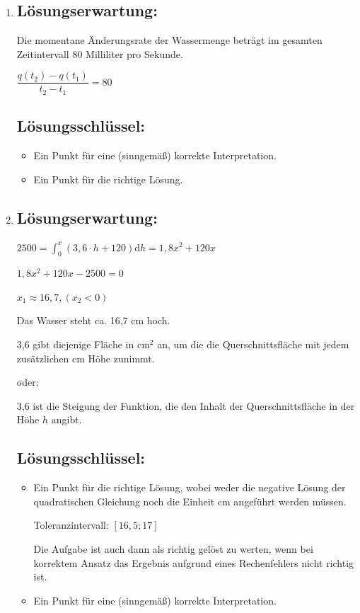 \begin{langesbeispiel}
{\begin{enumerate}
	\item \subsection{Lösungserwartung:}
			
		Die momentane Änderungsrate der Wassermenge beträgt im gesamten Zeitintervall 80 Milliliter pro Sekunde.
		
		$\dfrac{q(t_2)-q(t_1)}{t_2-t_1}=80$

	\subsection{Lösungsschlüssel:}
	
\begin{itemize}
	\item Ein Punkt für eine (sinngemäß) korrekte Interpretation.
	\item Ein Punkt für die richtige Lösung.
\end{itemize}

\item \subsection{Lösungserwartung:}
	$2500=\int^x_0{(3,6\cdot h+120)}$d$h=1,8x^2+120x$
	
	$1,8x^2+120x-2500=0$
	
	$x_1\approx 16,7, (x_2<0)$
	
	Das Wasser steht ca. 16,7 cm hoch.
	
	3,6 gibt diejenige Fläche in cm$^2$ an, um die die Querschnittsfläche mit jedem zusätzlichen cm Höhe zunimmt. 
	
	oder: 
	
	3,6 ist die Steigung der Funktion, die den Inhalt der Querschnittsfläche in der Höhe $h$ angibt.

	\subsection{Lösungsschlüssel:}
	
\begin{itemize}
	\item Ein Punkt für die richtige Lösung, wobei weder die negative Lösung der quadratischen Gleichung noch die Einheit cm angeführt werden müssen.
		
		Toleranzintervall: $[16,5; 17]$  
		
		Die Aufgabe ist auch dann als richtig gelöst zu werten, wenn bei korrektem Ansatz das Ergebnis aufgrund eines Rechenfehlers nicht richtig ist. 
	\item Ein Punkt für eine (sinngemäß) korrekte Interpretation.
\end{itemize}

\end{enumerate}}
		\end{langesbeispiel}